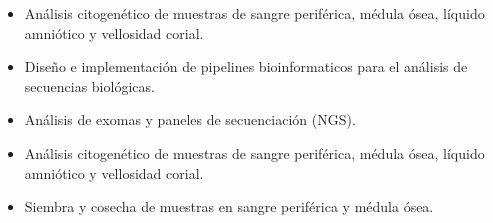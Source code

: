 \documentclass[10pt,a4paper,ragged2e,]{altacv}
\begin{document}

\begin{fullwidth}
\makecvheader
\end{fullwidth}



\begin{itemize}
\item Análisis citogenético de muestras de sangre periférica, médula ósea, líquido amniótico y vellosidad corial.
\item Diseño e implementación de pipelines bioinformaticos para el análisis de secuencias biológicas.
\item Análisis de exomas y paneles de secuenciación (NGS).
\end{itemize}

\divider

\begin{itemize}
\item Análisis citogenético de muestras de sangre periférica, médula ósea, líquido amniótico y vellosidad corial.
\item Siembra y cosecha de muestras en sangre periférica y médula ósea.
\end{itemize}
\end{document}
